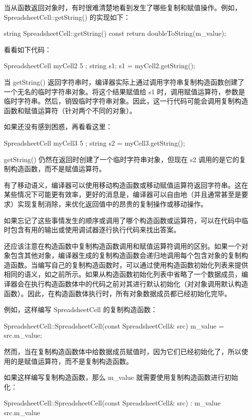 
当从函数返回对象时，有时很难清楚地看到发生了哪些复制和赋值操作。例如，SpreadsheetCell::getString() 的实现如下：

\begin{cpp}
string SpreadsheetCell::getString() const
{
    return doubleToString(m_value);
}
\end{cpp}

看看如下代码：

\begin{cpp}
SpreadsheetCell myCell2 { 5 };
string s1;
s1 = myCell2.getString();
\end{cpp}

当 getString() 返回字符串时，编译器实际上通过调用字符串复制构造函数创建了一个无名的临时字符串对象。将这个结果赋值给 s1 时，调用赋值运算符，参数是临时字符串。然后，销毁临时字符串对象。因此，这一行代码可能会调用复制构造函数和赋值运算符（针对两个不同的对象）。

如果还没有感到困惑，再看看这里：

\begin{cpp}
SpreadsheetCell myCell3 { 5 };
string s2 = myCell3.getString();
\end{cpp}

getString() 仍然在返回时创建了一个临时字符串对象，但现在 s2 调用的是它的复制构造函数，而不是赋值运算符。

有了移动语义，编译器可以使用移动构造函数或移动赋值运算符返回字符串。这在某些情况下可能更有效率，更好的消息是，编译器可以自由地（并且通常甚至是要求）实现复制消除，来优化返回值中的昂贵的复制操作或移动操作。

如果忘记了这些事情发生的顺序或调用了哪个构造函数或运算符，可以在代码中临时包含有用的输出或使用调试器逐行执行代码来找出答案。


还应该注意在构造函数中复制构造函数调用和赋值运算符调用的区别。如果一个对象包含其他对象，编译器生成的复制构造函数会递归地调用每个包含对象的复制构造函数。当编写自己的复制构造函数时，可以通过使用构造函数初始化列表来提供相同的语义，如之前所示。如果从构造函数初始化列表中省略了一个数据成员，编译器会在执行构造函数体中的代码之前对其进行默认初始化（对对象调用默认构造函数）。因此，在构造函数体执行时，所有对象数据成员都已经初始化完毕。

例如，这样编写 SpreadsheetCell 的复制构造函数：

\begin{cpp}
SpreadsheetCell::SpreadsheetCell(const SpreadsheetCell& src)
{
    m_value = src.m_value;
}
\end{cpp}

然而，当在复制构造函数体中给数据成员赋值时，因为它们已经初始化了，所以使用的是赋值运算符，而不是复制构造函数。

如果这样编写复制构造函数，那么 m\_value 就需要使用复制构造函数进行初始化：

\begin{cpp}
SpreadsheetCell::SpreadsheetCell(const SpreadsheetCell& src)
: m_value { src.m_value }
{}
\end{cpp}



















